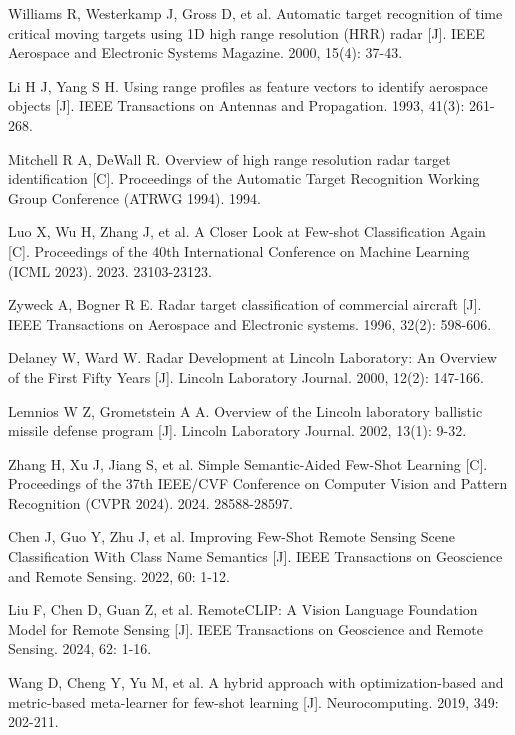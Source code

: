 \documentclass[doctor,twoside,ttf]{nudtpaper}
\begin{document}
\begin{thebibliography}{99}
 Williams R, Westerkamp J, Gross D, et al. Automatic target recognition of time critical moving targets using 1D high range resolution (HRR) radar [J]. IEEE Aerospace and Electronic Systems Magazine. 2000, 15(4): 37-43.

 Li H J, Yang S H. Using range profiles as feature vectors to identify aerospace objects [J]. IEEE Transactions on Antennas and Propagation. 1993, 41(3): 261-268.

 Mitchell R A, DeWall R. Overview of high range resolution radar target identification [C]. Proceedings of the Automatic Target Recognition Working Group Conference (ATRWG 1994). 1994.

 Luo X, Wu H, Zhang J, et al. A Closer Look at Few-shot Classification Again [C]. Proceedings of the 40th International Conference on Machine Learning (ICML 2023). 2023. 23103-23123.

 Zyweck A, Bogner R E. Radar target classification of commercial aircraft [J]. IEEE Transactions on Aerospace and Electronic systems. 1996, 32(2): 598-606.

 Delaney W, Ward W. Radar Development at Lincoln Laboratory: An Overview of the First Fifty Years [J]. Lincoln Laboratory Journal. 2000, 12(2): 147-166.

 Lemnios W Z, Grometstein A A. Overview of the Lincoln laboratory ballistic missile defense program [J]. Lincoln Laboratory Journal. 2002, 13(1): 9-32.

 Zhang H, Xu J, Jiang S, et al. Simple Semantic-Aided Few-Shot Learning [C]. Proceedings of the 37th IEEE/CVF Conference on Computer Vision and Pattern Recognition (CVPR 2024). 2024. 28588-28597.

 Chen J, Guo Y, Zhu J, et al. Improving Few-Shot Remote Sensing Scene Classification With Class Name Semantics [J]. IEEE Transactions on Geoscience and Remote Sensing. 2022, 60: 1-12.

 Liu F, Chen D, Guan Z, et al. RemoteCLIP: A Vision Language Foundation Model for Remote Sensing [J]. IEEE Transactions on Geoscience and Remote Sensing. 2024, 62: 1-16.

 Wang D, Cheng Y, Yu M, et al. A hybrid approach with optimization-based and metric-based meta-learner for few-shot learning [J]. Neurocomputing. 2019, 349: 202-211.


\end{thebibliography}
\end{document}
